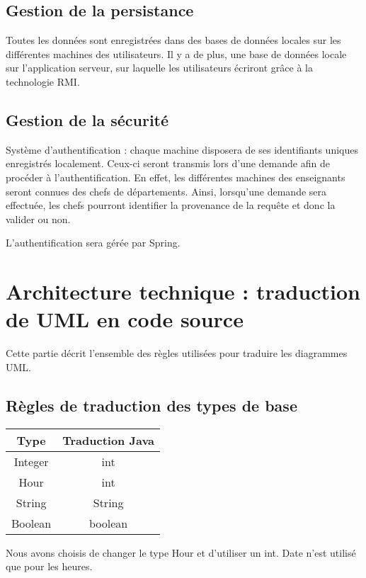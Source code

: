     \subsection{Gestion de la persistance}
    Toutes les données sont enregistrées dans des bases de données locales sur les différentes machines des utilisateurs. Il y a de plus, une base de données locale sur l'application serveur, sur laquelle les utilisateurs écriront grâce à la technologie RMI.
    
    \subsection{Gestion de la sécurité}
    Système d'authentification : chaque machine disposera de ses identifiants uniques enregistrés localement. Ceux-ci seront transmis lors d'une demande afin de procéder à l'authentification. En effet, les différentes machines des enseignants seront connues des chefs de départements. Ainsi, lorsqu'une demande sera effectuée, les chefs pourront identifier la provenance de la requête et donc la valider ou non.
    
    L'authentification sera gérée par Spring.
    

\section{Architecture technique : traduction de UML en code source}
    
    Cette partie décrit l'ensemble des règles utilisées pour traduire les diagrammes \textsc{UML}.
    
    \subsection{Règles de traduction des types de base}
    \begin{center}
        \begin{tabular}{|c|c|}
            \hline
            Type & Traduction Java\\
            \hline
            Integer & int \\
            Hour & int \\
            String & String \\
            Boolean & boolean\\
            \hline
        \end{tabular}
    \end{center}
    
    
    Nous avons choisis de changer le type Hour et d'utiliser un int.
    Date n'est utilisé que pour les heures.
    
